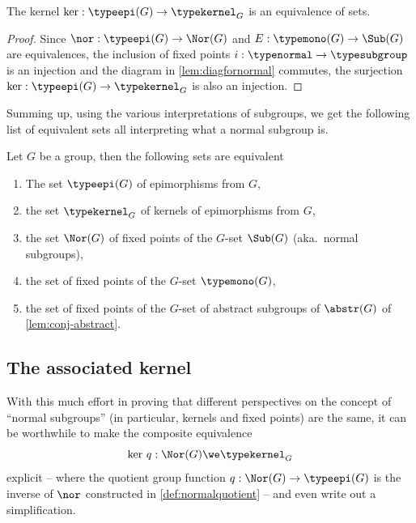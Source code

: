 \begin{corollary}
  \label{cor:normalisnormal}
  The kernel $\ker:\typeepi(G)\to \typekernel_G$ is an equivalence of sets.
\end{corollary}
\begin{proof} Since $\nor:\typeepi(G)\to\Nor(G)$ and $E:\typemono(G)\to\Sub(G)$ are equivalences, the inclusion of fixed points $i:\typenormal\to\typesubgroup$ is an injection and the diagram
in \cref{lem:diagfornormal} commutes, the surjection $\ker:\typeepi(G)\to\typekernel_G$ is also an injection.
\end{proof}


Summing up, using the various interpretations of subgroups, we get the following list of equivalent sets all interpreting what a normal subgroup is.
\begin{lemma}
  \label{lem:characterizations of normal}
  Let $G$ be a group, then the following sets are equivalent
\begin{enumerate}
\item The set $\typeepi(G)$ of epimorphisms from $G$,
\item the set $\typekernel_G$ of kernels of epimorphisms from $G$,
\item the set $\Nor(G)$ of fixed points of the $G$-set $\Sub(G)$ (aka.~normal subgroups),
\item the set of fixed points of the $G$-set $\typemono(G)$,
\item the set of fixed points of the $G$-set of abstract subgroups of $\abstr(G)$ of \cref{lem:conj-abstract}.
\end{enumerate}
\end{lemma}


\subsection{The associated kernel}
\label{sec:assker}

With this much effort in proving that different perspectives on the concept of ``normal subgroups'' (in particular, kernels and fixed points) are the same, it can be worthwhile to make the composite equivalence
$$\ker\,q:\Nor(G)\we\typekernel_G$$
explicit -- where the quotient group function $q:\Nor(G)\to\typeepi(G)$ is the inverse of $\nor$ constructed in \cref{def:normalquotient} --  and even write out a simplification.

